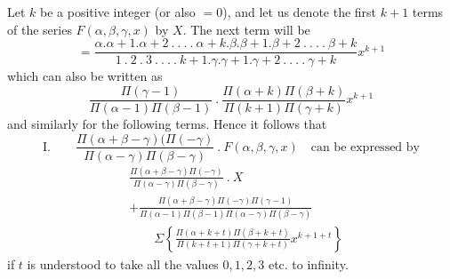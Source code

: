 
Let $k$ be a positive integer (or also $=0$), and let us denote the first $k+1$ terms of the series $F(\alpha,\beta,\gamma,x)$ by $X$. The next term will be
\[
=\frac{\alpha.\alpha+1.\alpha+2\ .\ .\ .\ .\ \alpha+k.\beta.\beta+1.\beta+2\ .\ .\ .\ .\ \beta+k}
{1\ .\ 2\ .\ 3\ .\ .\ .\ .\ k+1.\gamma.\gamma+1.\gamma+2\ .\ .\ .\ .\ \gamma+k}x^{k+1}
\]
which can also be written as
\[
\frac{\Pi(\gamma-1)}{\Pi(\alpha-1)\Pi(\beta-1)}\ .\
\frac{\Pi(\alpha+k)\Pi(\beta+k)}{\Pi(k+1)\Pi(\gamma+k)}x^{k+1}
\]
and similarly for the following terms. Hence it follows that
\[
\mathrm{I.}\qquad
\frac{\Pi(\alpha+\beta-\gamma)(\Pi(-\gamma)}{\Pi(\alpha-\gamma)\Pi(\beta-\gamma)}\ .\ F(\alpha,\beta,\gamma,x)
\quad\text{can be expressed by}
\]
\[
\begin{aligned}&\frac{\Pi(\alpha+\beta-\gamma)\Pi(-\gamma)}{\Pi(\alpha-\gamma)\Pi(\beta-\gamma)}\ .\ X\\&+\frac{\Pi(\alpha+\beta-\gamma)\Pi(-\gamma)\Pi(\gamma-1)}{\Pi(\alpha-1)\Pi(\beta-1)\Pi(\alpha-\gamma)\Pi(\beta-\gamma)}\\&\qquad\Sigma\left\{\frac{\Pi(\alpha+k+t)\Pi(\beta+k+t)}{\Pi(k+t+1)\Pi(\gamma+k+t)}x^{k+1+t}\right\}\end{aligned}
\]
if $t$ is understood to take all the values $0,1,2,3$ etc. to infinity.

